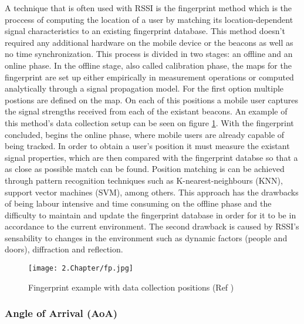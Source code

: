A technique that is often used with \ac{RSSI} is the fingerprint method which is the proccess of computing the location of a user by matching its location-dependent signal characteristics to an existing fingerprint database. This method doesn't required any additional hardware on the mobile device or the beacons as well as no time synchronization. This process is divided in two stages: an offline and an online phase. In the offline stage, also called calibration phase, the maps for the fingerprint are set up either empirically in measurement operations or computed analytically through a signal propagation model. For the first option multiple postions are defined on the map. On each of this positions a mobile user captures the signal strengths received from each of the existant beacons. An example of this method's data collection setup can be seen on figure \ref{fig:fp}. With the fingerprint concluded, begins the online phase, where mobile users are already capable of being tracked. In order to obtain a user's position it must measure the existant signal properties, which are then compared with the fingerprint databse so that a as close as possible match can be found. Position matching is can be achieved through pattern recognition techniques such as K-nearest-neighbours (KNN), support vector machines (SVM), among others.
This approach has the drawbacks of being labour intensive and time consuming on the offline phase and the difficulty to maintain and update the fingerprint database in order for it to be in accordance to the current environment. The second drawback is caused by \ac{RSSI}'s sensability to changes in the environment such as dynamic factors (people and doors), diffraction and reflection. 


\begin{figure}[H]
	\centering
		\texttt{[image: 2.Chapter/fp.jpg]}
	\caption[Fingerprint example with data collection positions (Ref \cite{fingerprint}) ]{ Fingerprint example with data collection positions (Ref \cite{fingerprint}) }
	\label{fig:fp}
\end{figure}

\subsubsection{Angle of Arrival (AoA) }
\label{subsubsec:aoa}

